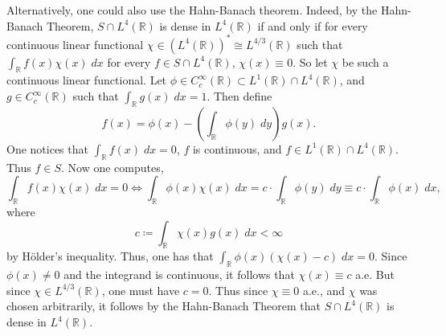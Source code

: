 \documentclass{article}
\begin{document}
	Alternatively, one could also use the Hahn-Banach theorem. Indeed, by the Hahn-Banach Theorem, $S \cap L^{4}(\mathbb{R})$ is dense in $L^{4}(\mathbb{R})$ if and only if for every continuous linear functional $\chi \in (L^{4}(\mathbb{R}))^{\ast} \cong L^{4/3}(\mathbb{R})$ such that $\int_{\mathbb{R}}f(x)\chi(x)\;dx$ for every $f \in S \cap L^{4}(\mathbb{R})$, $\chi(x) \equiv 0$. So let $\chi$ be such a continuous linear functional. Let $\phi \in C_{c}^{\infty}(\mathbb{R}) \subset L^{1}(\mathbb{R}) \cap L^{4}(\mathbb{R})$, and $g \in C_{c}^{\infty}(\mathbb{R})$ such that $\int_{\mathbb{R}}g(x)\;dx = 1$. Then define 
	\begin{equation*}
		f(x) = \phi(x) - \left(\int_{\mathbb{R}}\phi(y)\;dy\right)g(x). 
	\end{equation*}
	One notices that $\int_{\mathbb{R}}f(x)\;dx = 0$, $f$ is continuous, and $f \in L^{1}(\mathbb{R}) \cap L^{4}(\mathbb{R})$. Thus $f \in S$. Now one computes, 
	\begin{equation*}
		\int_{\mathbb{R}}f(x)\chi(x)\;dx = 0 \iff \int_{\mathbb{R}}\phi(x)\chi(x)\;dx = c \cdot \int_{\mathbb{R}}\phi(y)\;dy \equiv c \cdot \int_{\mathbb{R}}\phi(x)\;dx, 
	\end{equation*}
	where 
	\begin{equation*}
		c \coloneqq \int_{\mathbb{R}}\chi(x)g(x)\;dx < \infty 
	\end{equation*}
	by H\"older's inequality. Thus, one has that $\int_{\mathbb{R}}\phi(x)(\chi(x) - c)\;dx = 0$. Since $\phi(x) \neq 0$ and the integrand is continuous, it follows that $\chi(x) \equiv c$ a.e. But since $\chi \in L^{4/3}(\mathbb{R})$, one must have $c = 0$. Thus since $\chi \equiv 0$ a.e., and $\chi$ was chosen arbitrarily, it follows by the Hahn-Banach Theorem that $S \cap L^{4}(\mathbb{R})$ is dense in $L^{4}(\mathbb{R})$. 
	
\end{document}

